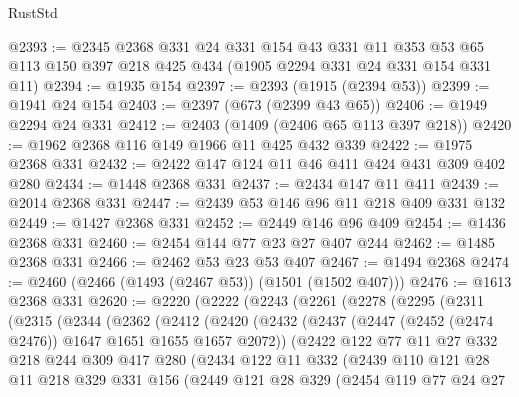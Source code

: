 \begin{lexlean}{RustStd}
\begin{coremodule}
@2393 := @2345
    @2368
    @331
    @24
    @331
    @154
    @43
    @331
    @11
    @353
    @53
    @65
    @113
    @150
    @397
    @218
    @425
    @434
    (@1905 @2294 @331 @24 @331 @154 @331 @11)
@2394 := @1935 @154
@2397 := @2393 (@1915 (@2394 @53))
@2399 := @1941 @24 @154
@2403 := @2397 (@673 (@2399 @43 @65))
@2406 := @1949 @2294 @24 @331
@2412 := @2403 (@1409 (@2406 @65 @113 @397 @218))
@2420 := @1962 @2368 @116 @149 @1966 @11 @425 @432 @339
@2422 := @1975 @2368 @331
@2432 := @2422 @147 @124 @11 @46 @411 @424 @431 @309 @402 @280
@2434 := @1448 @2368 @331
@2437 := @2434 @147 @11 @411
@2439 := @2014 @2368 @331
@2447 := @2439 @53 @146 @96 @11 @218 @409 @331 @132
@2449 := @1427 @2368 @331
@2452 := @2449 @146 @96 @409
@2454 := @1436 @2368 @331
@2460 := @2454 @144 @77 @23 @27 @407 @244
@2462 := @1485 @2368 @331
@2466 := @2462 @53 @23 @53 @407
@2467 := @1494 @2368
@2474 := @2460 (@2466 (@1493 (@2467 @53)) (@1501 (@1502 @407)))
@2476 := @1613 @2368 @331
@2620 := @2220
    (@2222
      (@2243
        (@2261
          (@2278
            (@2295
              (@2311
                (@2315
                  (@2344
                    (@2362
                      (@2412
                        (@2420
                          (@2432
                            (@2437 (@2447 (@2452 (@2474 @2476)) @1647 @1651 @1655 @1657 @2072))
                            (@2422
                              @122
                              @77
                              @11
                              @27
                              @332
                              @218
                              @244
                              @309
                              @417
                              @280
                              (@2434
                                @122
                                @11
                                @332
                                (@2439
                                  @110
                                  @121
                                  @28
                                  @11
                                  @218
                                  @329
                                  @331
                                  @156
                                  (@2449
                                    @121
                                    @28
                                    @329
                                    (@2454
                                      @119
                                      @77
                                      @24
                                      @27

\end{coremodule}
\end{lexlean}
